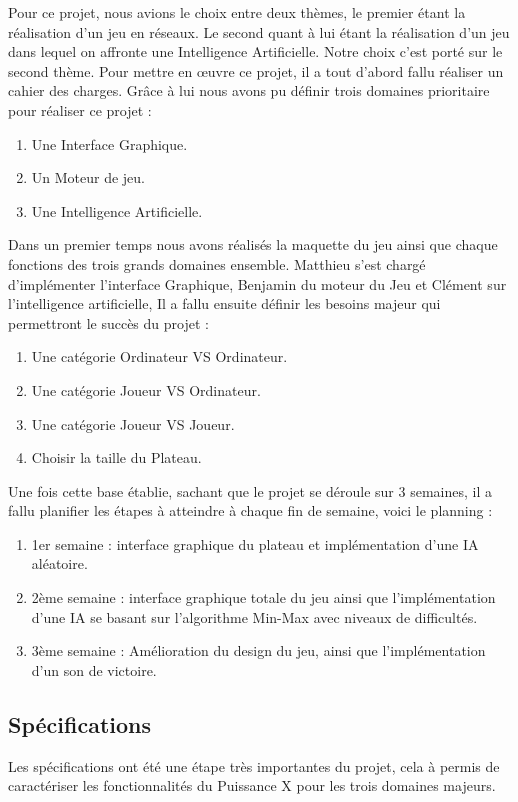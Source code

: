 \documentclass[a4paper,oneside]{article}
\begin{document}
Pour ce projet, nous avions le choix entre deux thèmes, le premier étant la réalisation d'un jeu en réseaux.
Le second quant à lui étant la réalisation d'un jeu dans lequel on affronte une Intelligence Artificielle.
Notre choix c'est porté sur le second thème.
Pour mettre en œuvre ce projet, il a tout d'abord fallu réaliser un cahier des charges.
Grâce à lui nous avons pu définir trois domaines prioritaire pour réaliser ce projet :
\begin{enumerate}
	\item Une Interface Graphique.
	\item Un Moteur de jeu.
	\item Une Intelligence Artificielle.
\end{enumerate}
Dans un premier temps nous avons réalisés la maquette du jeu ainsi que chaque fonctions des trois grands domaines ensemble. Matthieu s'est chargé d'implémenter l'interface Graphique, Benjamin du moteur du Jeu et Clément sur l'intelligence artificielle, 
Il a fallu ensuite définir les besoins majeur qui permettront le succès du projet :
\begin{enumerate}
	\item Une catégorie Ordinateur VS Ordinateur.
	\item Une catégorie Joueur VS Ordinateur.
	\item Une catégorie Joueur VS Joueur.
	\item Choisir la taille du Plateau.
\end{enumerate}
Une fois cette base établie, sachant que le projet se déroule sur 3 semaines, il a fallu planifier les étapes à atteindre à chaque fin de semaine, voici le planning :
\begin{enumerate}
	\item 1er semaine : interface graphique du plateau et implémentation d'une IA aléatoire.
	\item 2ème semaine : interface graphique totale du jeu ainsi que l'implémentation d'une IA se basant sur l'algorithme Min-Max avec niveaux de difficultés.
	\item 3ème semaine : Amélioration du design du jeu, ainsi que l'implémentation d'un son de victoire.
\end{enumerate}


\subsection{Spécifications}

Les spécifications ont été une étape très importantes du projet, cela à permis de caractériser les fonctionnalités du Puissance X pour les trois domaines majeurs.
\end{document}
